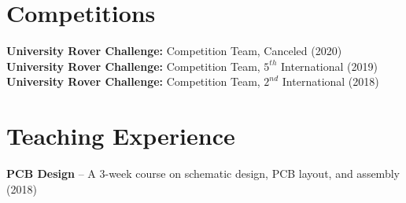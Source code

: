 \documentclass[letterpaper,11pt]{article}
\begin{document}
\section{Competitions}
\begin{itemize}[leftmargin=0.15in, label={}]
	\small{\item{\textbf{University Rover Challenge:} Competition Team, Canceled (2020)\\
				 \textbf{University Rover Challenge:} Competition Team, $5^{th}$ International (2019)\\
				 \textbf{University Rover Challenge:} Competition Team, $2^{nd}$ International (2018)\\
	}}
\end{itemize}

\section{Teaching Experience}
\begin{itemize}[leftmargin=0.15in, label={}]
	\small{\item{\textbf{PCB Design} -- A 3-week course on schematic design, PCB layout, and assembly (2018)
	}}
\end{itemize}

\thispagestyle{myheadings}

\end{document}
